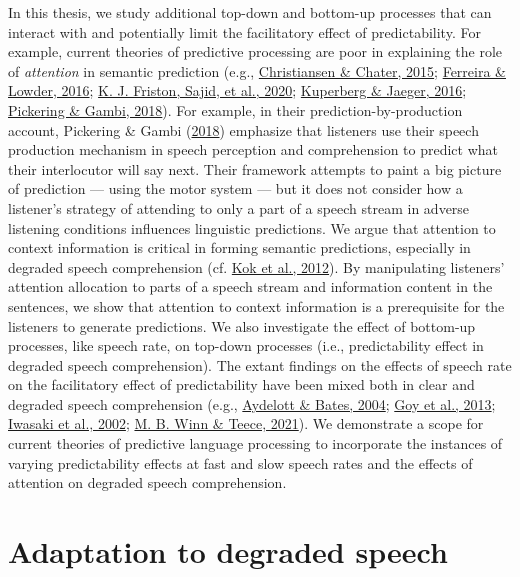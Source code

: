 \documentclass[a4paper, nobind]{templates/ociamthesis}
\begin{document}
In this thesis, we study additional top-down and bottom-up processes that can interact with and potentially limit the facilitatory effect of predictability.
For example, current theories of predictive processing are poor in explaining the role of \emph{attention} in semantic prediction (e.g., \protect\hyperlink{ref-Christiansen2015}{Christiansen \& Chater, 2015}; \protect\hyperlink{ref-Ferreira2016}{Ferreira \& Lowder, 2016}; \protect\hyperlink{ref-Friston2020b}{K. J. Friston, Sajid, et al., 2020}; \protect\hyperlink{ref-Kuperberg2016}{Kuperberg \& Jaeger, 2016}; \protect\hyperlink{ref-Pickering2018}{Pickering \& Gambi, 2018}).
For example, in their prediction-by-production account, Pickering \& Gambi (\protect\hyperlink{ref-Pickering2018}{2018}) emphasize that listeners use their speech production mechanism in speech perception and comprehension to predict what their interlocutor will say next.
Their framework attempts to paint a big picture of prediction --- using the motor system ---
but it does not consider how a listener's strategy of attending to only a part of a speech stream in adverse listening conditions influences linguistic predictions.
We argue that attention to context information is critical in forming semantic predictions,
especially in degraded speech comprehension (cf. \protect\hyperlink{ref-Kok2012}{Kok et al., 2012}).
By manipulating listeners' attention allocation to parts of a speech stream and information content in the sentences, we show that attention to context information is a prerequisite for the listeners to generate predictions.
We also investigate the effect of bottom-up processes, like speech rate, on top-down processes (i.e., predictability effect in degraded speech comprehension).
The extant findings on the effects of speech rate on the facilitatory effect of predictability have been mixed both in clear and degraded speech comprehension (e.g., \protect\hyperlink{ref-Aydelott2004}{Aydelott \& Bates, 2004}; \protect\hyperlink{ref-Goy2013}{Goy et al., 2013}; \protect\hyperlink{ref-Iwasaki2002}{Iwasaki et al., 2002}; \protect\hyperlink{ref-Winn2021}{M. B. Winn \& Teece, 2021}).
We demonstrate a scope for current theories of predictive language processing to incorporate
the instances of varying predictability effects at fast and slow speech rates and the effects of attention on degraded speech comprehension.

\hypertarget{background-adaptation}{%
\section{Adaptation to degraded speech}\label{background-adaptation}}
\end{document}
